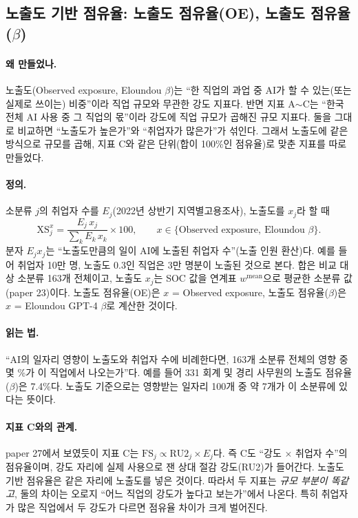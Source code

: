 \documentclass[11pt]{article}
\begin{document}
\subsection{노출도 기반 점유율: 노출도 점유율(OE), 노출도 점유율($\beta$)}

\paragraph{왜 만들었나.} 노출도(Observed exposure, Eloundou $\beta$)는 ``한 직업의 과업 중 AI가 할 수 있는(또는 실제로 쓰이는) 비중''이라 직업 규모와 무관한 강도 지표다. 반면 지표 A$\sim$C는 ``한국 전체 AI 사용 중 그 직업의 몫''이라 강도에 직업 규모가 곱해진 규모 지표다. 둘을 그대로 비교하면 ``노출도가 높은가''와 ``취업자가 많은가''가 섞인다. 그래서 노출도에 같은 방식으로 규모를 곱해, 지표 C와 같은 단위(합이 100\%인 점유율)로 맞춘 지표를 따로 만들었다.

\paragraph{정의.} 소분류 $j$의 취업자 수를 $E_j$(2022년 상반기 지역별고용조사), 노출도를 $x_j$라 할 때
\[
  \mathrm{XS}^x_j = \frac{E_j \, x_j}{\sum_k E_k \, x_k} \times 100, \qquad x \in \{\text{Observed exposure},\ \text{Eloundou } \beta\}.
\]
분자 $E_j x_j$는 ``노출도만큼의 일이 AI에 노출된 취업자 수''(노출 인원 환산)다. 예를 들어 취업자 10만 명, 노출도 0.3인 직업은 3만 명분이 노출된 것으로 본다. 합은 비교 대상 소분류 163개 전체이고, 노출도 $x_j$는 SOC 값을 연계표 $w^{\text{mean}}$으로 평균한 소분류 값(paper 23)이다. 노출도 점유율(OE)은 $x$ = Observed exposure, 노출도 점유율($\beta$)은 $x$ = Eloundou GPT-4 $\beta$로 계산한 것이다.

\paragraph{읽는 법.} ``AI의 일자리 영향이 노출도와 취업자 수에 비례한다면, 163개 소분류 전체의 영향 중 몇 \%가 이 직업에서 나오는가''다. 예를 들어 331 회계 및 경리 사무원의 노출도 점유율($\beta$)은 7.4\%다. 노출도 기준으로는 영향받는 일자리 100개 중 약 7개가 이 소분류에 있다는 뜻이다.

\paragraph{지표 C와의 관계.} paper 27에서 보였듯이 지표 C는 $\mathrm{FS}_j \propto \mathrm{RU2}_j \times E_j$다. 즉 C도 ``강도 $\times$ 취업자 수''의 점유율이며, 강도 자리에 실제 사용으로 잰 상대 절감 강도(RU2)가 들어간다. 노출도 기반 점유율은 같은 자리에 노출도를 넣은 것이다. 따라서 두 지표는 \emph{규모 부분이 똑같고}, 둘의 차이는 오로지 ``어느 직업의 강도가 높다고 보는가''에서 나온다. 특히 취업자가 많은 직업에서 두 강도가 다르면 점유율 차이가 크게 벌어진다.
\end{document}
